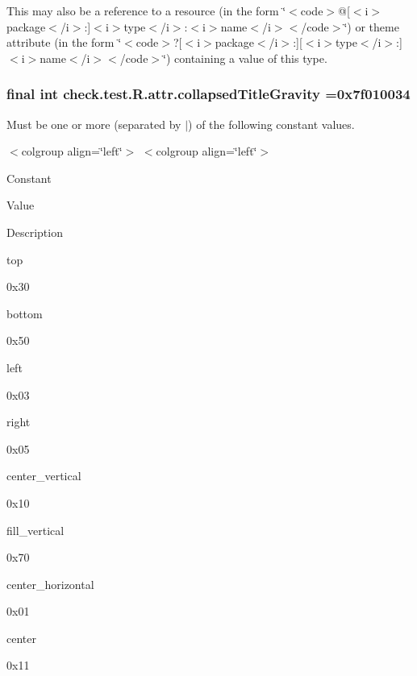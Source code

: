 This may also be a reference to a resource (in the form \char`\"{}$<$code$>$@\mbox{[}$<$i$>$package$<$/i$>$\+:\mbox{]}$<$i$>$type$<$/i$>$\+:$<$i$>$name$<$/i$>$$<$/code$>$\char`\"{}) or theme attribute (in the form \char`\"{}$<$code$>$?\mbox{[}$<$i$>$package$<$/i$>$\+:\mbox{]}\mbox{[}$<$i$>$type$<$/i$>$\+:\mbox{]}$<$i$>$name$<$/i$>$$<$/code$>$\char`\"{}) containing a value of this type. \hypertarget{classcheck_1_1test_1_1_r_1_1attr_a9e98ef24c71f088c89ee2b106577575f}{}
\subsubsection[{collapsed\+Title\+Gravity}]{\setlength{\rightskip}{0pt plus 5cm}final int check.\+test.\+R.\+attr.\+collapsed\+Title\+Gravity =0x7f010034\hspace{0.3cm}{\ttfamily [static]}}\label{classcheck_1_1test_1_1_r_1_1attr_a9e98ef24c71f088c89ee2b106577575f}
Must be one or more (separated by \textquotesingle{}$\vert$\textquotesingle{}) of the following constant values.

\begin{TabularC}{0}
\hline
\end{TabularC}
$<$colgroup align=\char`\"{}left\char`\"{}$>$ $<$colgroup align=\char`\"{}left\char`\"{}$>$ 

Constant

Value

Description 

{\ttfamily top}

0x30

{\ttfamily bottom}

0x50

{\ttfamily left}

0x03

{\ttfamily right}

0x05

{\ttfamily center\+\_\+vertical}

0x10

{\ttfamily fill\+\_\+vertical}

0x70

{\ttfamily center\+\_\+horizontal}

0x01

{\ttfamily center}

0x11

